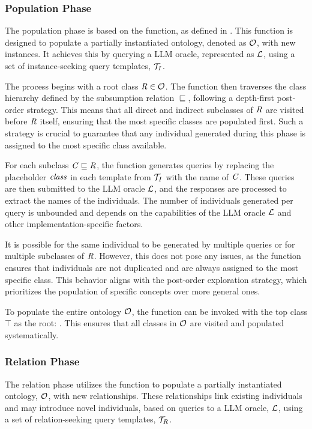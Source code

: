 \subsubsection{Population Phase}
\label{subsubsec:population-phase}
%

%
The population phase is based on the \populate{} function, as defined in .
%
This function is designed to populate a partially instantiated ontology, denoted as $\relset{O}$, with new instances.
%
It achieves this by querying a \gls{LLM} oracle, represented as $\relset{L}$, using a set of instance-seeking query templates, $\relset{T}_{I}$.


The process begins with a root class $\concept{R} \in \relset{O}$.
%
The function then traverses the class hierarchy defined by the subsumption relation $\sqsubseteq$, following a depth-first post-order strategy.
%
This means that all direct and indirect subclasses of $\concept{R}$ are visited before $\concept{R}$ itself, ensuring that the most specific classes are populated first.
%
Such a strategy is crucial to guarantee that any individual generated during this phase is assigned to the most specific class available.


For each subclass $\concept{C} \sqsubseteq \concept{R}$, the function generates queries by replacing the placeholder $\mathit{class}$ in each template from $\relset{T}_{I}$ with the name of $\concept{C}$.
%
These queries are then submitted to the \gls{LLM} oracle $\relset{L}$, and the responses are processed to extract the names of the individuals.
%
The number of individuals generated per query is unbounded and depends on the capabilities of the \gls{LLM} oracle $\relset{L}$ and other implementation-specific factors.


It is possible for the same individual to be generated by multiple queries or for multiple subclasses of $\concept{R}$.
%
However, this does not pose any issues, as the \addToClass{} function ensures that individuals are not duplicated and are always assigned to the most specific class.
%
This behavior aligns with the post-order exploration strategy, which prioritizes the population of specific concepts over more general ones.


To populate the entire ontology $\relset{O}$, the function can be invoked with the top class $\top$ as the root:
%
.
%
This ensures that all classes in $\relset{O}$ are visited and populated systematically.


\subsubsection{Relation Phase}
\label{subsubsec:relation-phase}
%

%
The relation phase utilizes the \relate{} function to populate a partially instantiated ontology, \(\relset{O}\), with new relationships.
%
These relationships link existing individuals and may introduce novel individuals, based on queries to a \gls{LLM} oracle, \(\relset{L}\), using a set of relation-seeking query templates, \(\relset{T}_{R}\).

